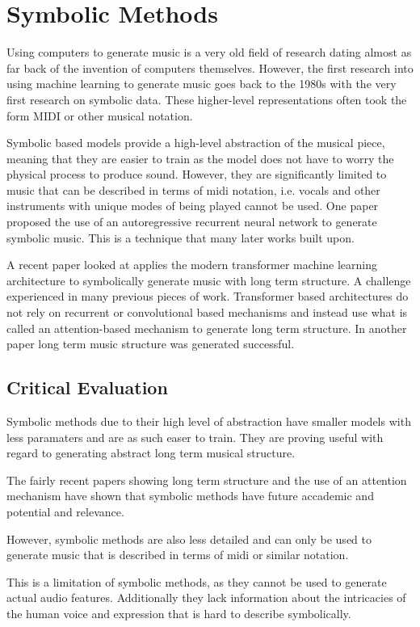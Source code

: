 \section{Symbolic Methods}

Using computers to generate music is a very old field of research dating almost as far back of the invention of computers themselves\cite{Hiller1958Musical}. However, the first research into using machine learning to generate music goes back to the 1980s\cite{ConnectionistComposition}\cite{GradientDescentLearning} with the very first research on symbolic data. These higher-level representations often took the form MIDI or other musical notation.

Symbolic based models provide a high-level abstraction of the musical piece, meaning that they are easier to train as the model does not have to worry the physical process to produce sound. However, they are significantly limited to music that can be described in terms of midi notation, i.e. vocals and other instruments with unique modes of being played cannot be used. One paper proposed the use of an autoregressive recurrent neural network to generate symbolic music. This is a technique that many later works built upon.

A recent paper looked at applies the modern transformer machine learning architecture to symbolically generate music with long term structure. A challenge experienced in many previous pieces of work\cite{LongTermStructure}. Transformer based architectures do not rely on recurrent or convolutional based mechanisms and instead use what is called an attention-based mechanism to generate long term structure\cite{Attention}. In another paper \cite{LongTermStructure} long term music structure was generated successful.

\subsection{Critical Evaluation}

Symbolic methods due to their high level of abstraction have smaller models with less paramaters and are as such easer to train. They are proving useful with regard to generating abstract long term musical structure.

The fairly recent papers showing long term structure\cite{LongTermStructure} and the use of an attention mechanism\cite{Attention} have shown that symbolic methods have future accademic and potential and relevance.

However, symbolic methods are also less detailed and can only be used to generate music that is described in terms of midi or similar notation.

This is a limitation of symbolic methods, as they cannot be used to generate actual audio features. Additionally they lack information about the intricacies of the human voice and expression that is hard to describe symbolically.